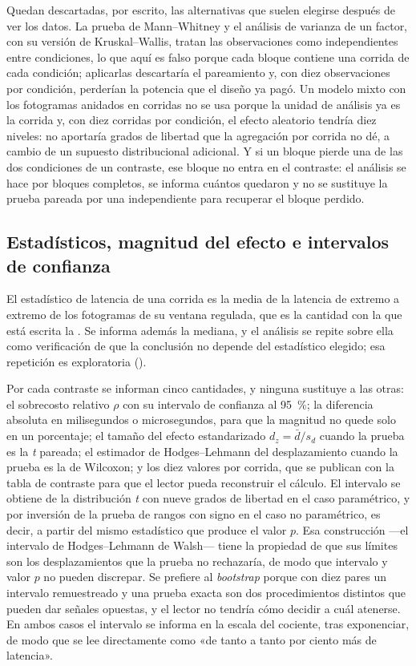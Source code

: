 Quedan descartadas, por escrito, las alternativas que suelen elegirse después
de ver los datos. La prueba de Mann--Whitney y el análisis de varianza de un
factor, con su versión de Kruskal--Wallis, tratan las observaciones como
independientes entre condiciones, lo que aquí es falso porque cada bloque
contiene una corrida de cada condición; aplicarlas descartaría el pareamiento
y, con diez observaciones por condición, perderían la potencia que el diseño ya
pagó. Un modelo mixto con los fotogramas anidados en corridas no se usa porque
la unidad de análisis ya es la corrida y, con diez corridas por condición, el
efecto aleatorio tendría diez niveles: no aportaría grados de libertad que la
agregación por corrida no dé, a cambio de un supuesto distribucional
adicional. Y si un bloque pierde una de las dos condiciones de un contraste,
ese bloque no entra en el contraste: el análisis se hace por bloques
completos, se informa cuántos quedaron y no se sustituye la prueba pareada por
una independiente para recuperar el bloque perdido.

\subsection{Estadísticos, magnitud del efecto e intervalos de confianza}
\label{sec:analysis-effects}

El estadístico de latencia de una corrida es la media de la latencia de
extremo a extremo de los fotogramas de su ventana regulada, que es la cantidad
con la que está escrita la . Se informa además la mediana, y
el análisis se repite sobre ella como verificación de que la conclusión no
depende del estadístico elegido; esa repetición es exploratoria
().

Por cada contraste se informan cinco cantidades, y ninguna sustituye a las
otras: el sobrecosto relativo $\rho$ con su intervalo de confianza al
95~\%; la diferencia absoluta en milisegundos o microsegundos, para que la
magnitud no quede solo en un porcentaje; el tamaño del efecto estandarizado
$d_z = \bar d / s_d$ \cite{lakens2013} cuando la prueba es la \emph{t}
pareada; el estimador de Hodges--Lehmann del desplazamiento cuando la prueba es
la de Wilcoxon; y los
diez valores por corrida, que se publican con la tabla de contraste para que
el lector pueda reconstruir el cálculo. El intervalo se obtiene de la
distribución \emph{t} con nueve grados de libertad en el caso paramétrico, y
por inversión de la prueba de rangos con signo en el caso no paramétrico, es
decir, a partir del mismo estadístico que produce el valor $p$. Esa
construcción ---el intervalo de Hodges--Lehmann de Walsh--- tiene la propiedad
de que sus límites son los desplazamientos que la prueba no rechazaría, de
modo que intervalo y valor $p$ no pueden discrepar. Se prefiere al
\emph{bootstrap} porque con diez pares un intervalo remuestreado y una prueba
exacta son dos procedimientos distintos que pueden dar señales opuestas, y el
lector no tendría cómo decidir a cuál atenerse. En ambos casos el intervalo se
informa en la escala del cociente, tras exponenciar, de modo que se lee
directamente como «de tanto a tanto por ciento más de latencia».

